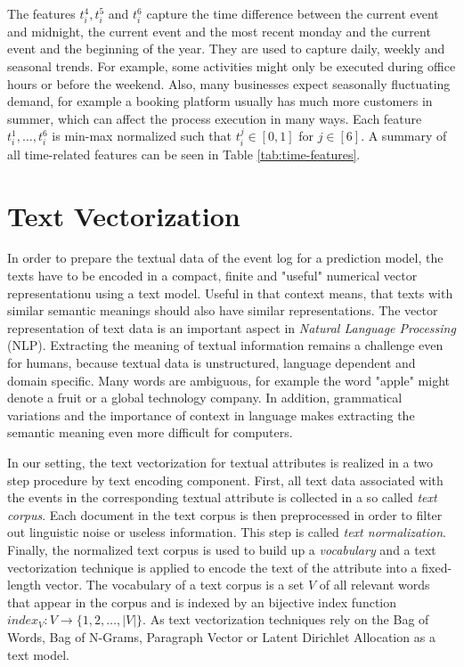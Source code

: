 The features $t_i^4, t_i^5$ and $t_i^6$ capture the time difference between the current event and midnight, the current event and the most recent monday and the current event and the beginning of the year. They are used to capture daily, weekly and seasonal trends.
For example, some activities might only be executed during office hours or before the weekend.
Also, many businesses expect seasonally fluctuating demand, for example a booking platform usually has much more customers in summer, which can affect the process execution in many ways.
Each feature $t_i^1, \dots, t_i^6$ is min-max normalized such that $t_i^j \in [0,1]$ for $j \in [6]$.
A summary of all time-related features can be seen in Table \ref{tab:time-features}.

\section{Text Vectorization}\label{sec:text}

In order to prepare the textual data of the event log for a prediction model, the texts have to be encoded in a compact, finite and "useful" numerical vector representationu using a text model.
Useful in that context means, that texts with similar semantic meanings should also have similar representations.
The vector representation of text data is an important aspect in \textit{Natural Language Processing} (NLP).
Extracting the meaning of textual information remains a challenge even for humans, because textual data is unstructured, language dependent and domain specific.
Many words are ambiguous, for example the word "apple" might denote a fruit or a global technology company.
In addition, grammatical variations and the importance of context in language makes extracting the semantic meaning even more difficult for computers.

In our setting, the text vectorization for textual attributes is realized in a two step procedure by text encoding component.
First, all text data associated with the events in the corresponding textual attribute is collected in a so called \textit{text corpus}.
Each document in the text corpus is then preprocessed in order to filter out linguistic noise or useless information.
This step is called \textit{text normalization}.
Finally, the normalized text corpus is used to build up a \textit{vocabulary} and a text vectorization technique is applied to encode the text of the attribute into a fixed-length vector.
The vocabulary of a text corpus is a set $V$ of all relevant words that appear in the corpus and is indexed by an bijective index function $index_V \colon V \to \{1, 2, \dots, |V|\}$.
As text vectorization techniques rely on the Bag of Words, Bag of N-Grams, Paragraph Vector or Latent Dirichlet Allocation as a text model.


